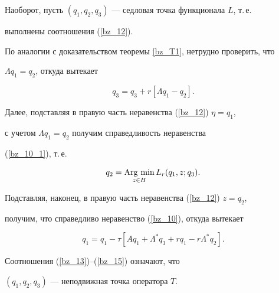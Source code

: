 \begin{pf}
Наоборот, пусть $(q_1, q_2, q_3)$ --- седловая точка функционала $L$, т.\,е.


выполнены соотношения (\ref{bz_12}). 


По аналогии с доказательством теоремы \ref{bz_T1}, нетрудно проверить, что


$\Lambda q_1=q_2$, откуда вытекает


\begin{equation}


q_3=q_3+r [{\Lambda q_1-q_2}]. 


\label{bz_13}


\end{equation}


Далее, подставляя в правую часть неравенства (\ref{bz_12}) $\eta=q_1$, 


с учетом $\Lambda q_1=q_2$ получим справедливость неравенства


(\ref{bz_10_1}), т.\,е.


\begin{equation}


q_2=\Argmin_{z \in H} L_r (q_1, z; q_3).


\label{bz_14}


\end{equation}


Подставляя, наконец, в правую часть неравенства (\ref{bz_12}) $z=q_2$,


получим, что справедливо неравенство (\ref{bz_10}), откуда вытекает


\begin{equation}


q_1=q_1-\tau [{A q_1+\Lambda^* q_3+r q_1-r \Lambda^* q_2}]. 


\label{bz_15}


\end{equation}


Соотношения (\ref{bz_13})--(\ref{bz_15}) означают, что 


$(q_1, q_2, q_3)$ --- неподвижная точка оператора $T$.


\end{pf}





